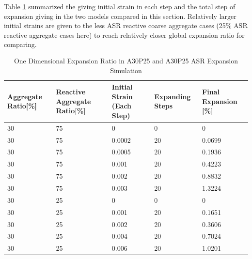 Table \ref{table:A30P25vsA30P75_EXP} summarized the giving initial strain in each step and the total step of expansion giving in the two models compared in this section. Relatively larger initial strains are given to the less ASR reactive coarse aggregate cases (25\% ASR reactive aggregate cases here) to reach relatively closer global expansion ratio for comparing.
\begin{table}[ht!]
\centering
\begin{tabular}{ ||p{2cm}|p{2cm}|p{2cm}|p{2cm}|p{2cm}|| }
 \hline
 Aggregate Ratio[\%] &  Reactive Aggregate Ratio[\%]  & Initial Strain (Each Step) & Expanding Steps & Final Expansion [\%] \\ [0.5ex]
 \hline\hline
 30 & 75 & 0 & 0 & 0\\
 30 & 75 & 0.0002 & 20 & 0.0699\\
 30 & 75 & 0.0005 & 20 & 0.1936\\
 30 & 75 & 0.001 & 20 & 0.4223\\
 30 & 75 & 0.002 & 20 & 0.8832\\
 30 & 75 & 0.003 & 20 & 1.3224\\

 30 & 25 & 0 & 0 & 0\\
 30 & 25 & 0.001 & 20 & 0.1651\\
 30 & 25 & 0.002 & 20 & 0.3606\\
 30 & 25 & 0.004 & 20 & 0.7024\\
 30 & 25 & 0.006 & 20 & 1.0201\\
 \hline
\end{tabular}
\caption{One Dimensional Expansion Ratio in A30P25 and A30P25 ASR Expansion Simulation}
\label{table:A30P25vsA30P75_EXP}
\end{table}




